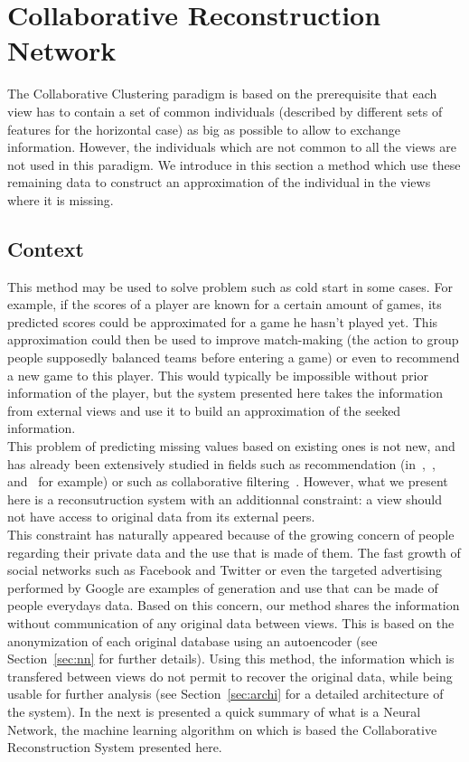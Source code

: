 \documentclass[a4paper]{report}
\begin{document}
\chapter{Collaborative Reconstruction Network}

The Collaborative Clustering paradigm is based on the prerequisite that each view has to contain a set of common individuals (described by different sets of features for the horizontal case) as big as possible to allow to exchange information. However, the individuals which are not common to all the views are not used in this paradigm. We introduce in this section a method which use these remaining data to construct an approximation of the individual in the views where it is missing.\\

\section{Context}
\label{sec:crs_context}

This method may be used to solve problem such as cold start in some cases. For example, if the scores of a player are known for a certain amount of games, its predicted scores could be approximated for a game he hasn't played yet. This approximation could then be used to improve match-making (the action to group people supposedly balanced teams before entering a game) or even to recommend a new game to this player. This would typically be impossible without prior information of the player, but the system presented here takes the information from external views and use it to build an approximation of the seeked information.\\

This problem of predicting missing values based on existing ones is not new, and has already been extensively studied in fields such as recommendation (in~\cite{chen2014hybrid},~\cite{hallinan2016recommended},~\cite{wang2015friendbook} and~\cite{covington2016deep} for example) or such as collaborative filtering~\cite{koren2015advances}. However, what we present here is a reconsutruction system with an additionnal constraint: a view should not have access to original data from its external peers.\\

This constraint has naturally appeared because of the growing concern of people regarding their private data and the use that is made of them. The fast growth of social networks such as Facebook and Twitter or even the targeted advertising performed by Google are examples of generation and use that can be made of people everydays data. Based on this concern, our method shares the information without communication of any original data between views. This is based on the anonymization of each original database using an autoencoder (see Section~\ref{sec:nn} for further details). Using this method, the information which is transfered between views do not permit to recover the original data, while being usable for further analysis (see Section~\ref{sec:archi} for a detailed architecture of the system). In the next is presented a quick summary of what is a Neural Network, the machine learning algorithm on which is based the Collaborative Reconstruction System presented here.
\end{document}
